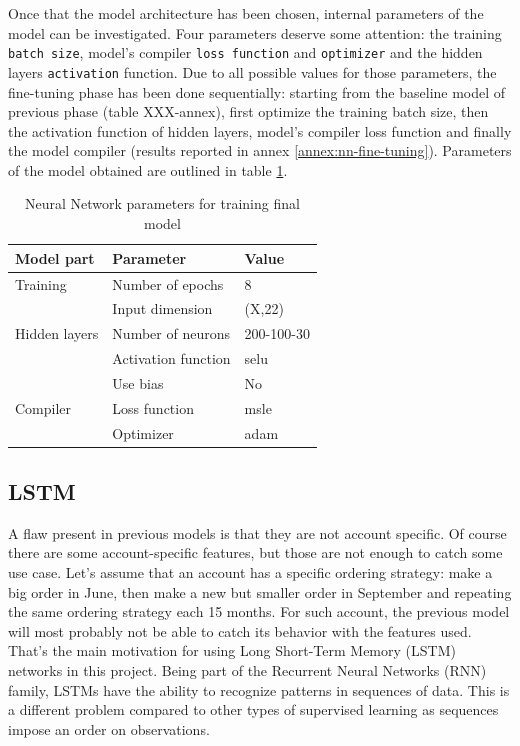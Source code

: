 Once that the model architecture has been chosen, internal parameters of the model can be investigated. Four parameters deserve some attention: the training \texttt{batch size}, model's compiler \texttt{loss function} and \texttt{optimizer} and the hidden layers \texttt{activation} function. Due to all possible values for those parameters, the fine-tuning phase has been done sequentially: starting from the baseline model of previous phase (table XXX-annex), first optimize the training batch size, then the activation function of hidden layers, model's compiler loss function and finally the model compiler (results reported in annex \ref{annex:nn-fine-tuning}). Parameters of the model obtained are outlined in table \ref{tab:nn-final-parameters}.

\begin{table}[]
    \centering
    \begin{tabular}{l|l|l}
        \textbf{Model part}           & \textbf{Parameter}                 & \textbf{Value}         \\ \hline
        Training                      & Number of epochs                   & 8                     \\
                                      & Input dimension                    & (X,22)                     \\ \hline
        Hidden layers                 & Number of neurons                  & 200-100-30                     \\
                                      & Activation function                & selu                     \\
                                      & Use bias                           & No                     \\ \hline
        \multicolumn{1}{l|}{Compiler} & \multicolumn{1}{l|}{Loss function} & \multicolumn{1}{l}{msle} \\
        \multicolumn{1}{l|}{}         & \multicolumn{1}{l|}{Optimizer}     & \multicolumn{1}{l}{adam}
    \end{tabular}
    \caption{Neural Network parameters for training final model}
    \label{tab:nn-final-parameters}
\end{table}


\subsection{LSTM}
A flaw present in previous models is that they are not account specific. Of course there are some account-specific features, but those are not enough to catch some use case. Let's assume that an account has a specific ordering strategy: make a big order in June, then make a new but smaller order in September and repeating the same ordering strategy each 15 months. For such account, the previous model will most probably not be able to catch its behavior with the features used. That's the main motivation for using Long Short-Term Memory (LSTM) networks in this project. Being part of the Recurrent Neural Networks (RNN) family, LSTMs have the ability to recognize patterns in sequences of data. This is a different problem compared to other types of supervised learning as sequences impose an order on observations.


